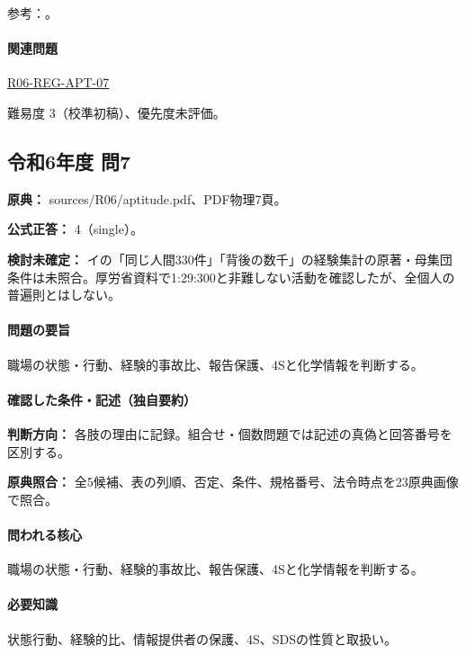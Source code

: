\par 参考：\cite{saf_welfare,saf_4s,saf_chemqa,saf_healthreport}。

\paragraph{関連問題} \hyperref[q:r06-reg-apt-07]{R06-REG-APT-07}

\par 難易度 3（校準初稿）、優先度未評価。

\subsection{令和6年度 問7}
\label{q:r06-reg-apt-07}

\noindent\textbf{原典：} sources/R06/aptitude.pdf、PDF物理7頁。

\textbf{公式正答：} 4（single）。

\par\textbf{検討未確定：} イの「同じ人間330件」「背後の数千」の経験集計の原著・母集団条件は未照合。厚労省資料で1:29:300と非難しない活動を確認したが、全個人の普遍則とはしない。

\paragraph{問題の要旨} 職場の状態・行動、経験的事故比、報告保護、4Sと化学情報を判断する。

\paragraph{確認した条件・記述（独自要約）}\mbox{}\par

\noindent\textbf{判断方向：} 各肢の理由に記録。組合せ・個数問題では記述の真偽と回答番号を区別する。\par

\noindent\textbf{原典照合：} 全5候補、表の列順、否定、条件、規格番号、法令時点を23原典画像で照合。\par

\paragraph{問われる核心} 職場の状態・行動、経験的事故比、報告保護、4Sと化学情報を判断する。

\paragraph{必要知識} 状態行動、経験的比、情報提供者の保護、4S、SDSの性質と取扱い。

